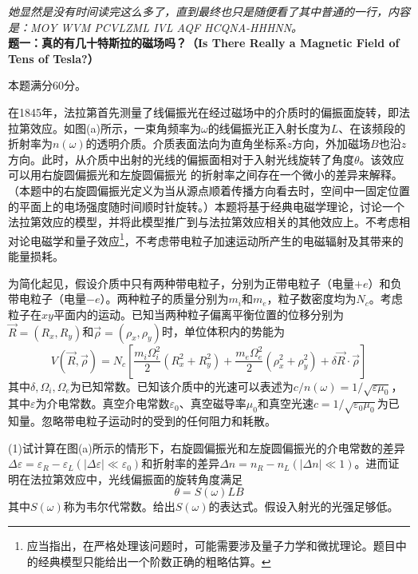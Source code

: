\documentclass[11pt,a4paper,onecolumn,UTF8]{ctexart}
\begin{document}
	\textit{她显然是没有时间读完这么多了，直到最终也只是随便看了其中普通的一行，内容是：MOY WVM PCVLZML IVL AQF HCQNA-HHHNN。}\\
	
	\noindent
	\textbf{题一：真的有几十特斯拉的磁场吗？（Is There Really a Magnetic Field of Tens of Tesla?）}
	
	本题满分60分。
	
	在1845年，法拉第首先测量了线偏振光在经过磁场中的介质时的偏振面旋转，即法拉第效应。如图(a)所示，一束角频率为$\omega$的线偏振光正入射长度为$L$、在该频段的折射率为$n(\omega)$的透明介质。介质表面法向为直角坐标系$z$方向，外加磁场$B$也沿$z$方向。此时，从介质中出射的光线的偏振面相对于入射光线旋转了角度$\theta$。该效应可以用右旋圆偏振光和左旋圆偏振光
	的折射率之间存在一个微小的差异来解释。（本题中的右旋圆偏振光定义为当从源点顺着传播方向看去时，空间中一固定位置的平面上的电场强度随时间顺时针旋转。）本题将基于经典电磁学理论，讨论一个法拉第效应的模型，并将此模型推广到与法拉第效应相关的其他效应上。不考虑相对论电磁学和量子效应\footnote{应当指出，在严格处理该问题时，可能需要涉及量子力学和微扰理论。题目中的经典模型只能给出一个阶数正确的粗略估算。}，不考虑带电粒子加速运动所产生的电磁辐射及其带来的能量损耗。
	
	为简化起见，假设介质中只有两种带电粒子，分别为正带电粒子（电量$+e$）和负带电粒子（电量$-e$）。两种粒子的质量分别为$m_i$和$m_e$，粒子数密度均为$N_c$。考虑粒子在$xy$平面内的运动。已知当两种粒子偏离平衡位置的位移分别为$\vec R=(R_x,R_y)$和$\vec\rho=(\rho_x,\rho_y)$时，单位体积内的势能为
	\begin{equation*}
		V(\vec R,\vec\rho)=N_c\left[\frac{m_i\Omega_i^2}{2}(R_x^2+R_y^2)+\frac{m_e\Omega_e^2}{2}(\rho_x^2+\rho_y^2)+\delta\vec{R}\cdot\vec{\rho}\right]
	\end{equation*}
	其中$\delta,\Omega_i,\Omega_e$为已知常数。已知该介质中的光速可以表述为$c/n(\omega)=1/\sqrt{\varepsilon\mu_0}$，其中$\varepsilon$为介电常数。真空介电常数$\varepsilon_0$、真空磁导率$\mu_0$和真空光速$c=1/\sqrt{\varepsilon_{0}\mu_0}$为已知量。忽略带电粒子运动时的受到的任何阻力和耗散。
	
	(1)试计算在图(a)所示的情形下，右旋圆偏振光和左旋圆偏振光的介电常数的差异$\Delta\varepsilon=\varepsilon_R-\varepsilon_L(|\Delta\varepsilon|\ll\varepsilon_{0})$和折射率的差异$\Delta n=n_R-n_L(|\Delta n|\ll1)$。进而证明在法拉第效应中，光线偏振面的旋转角度满足
	\begin{equation*}
		\theta=S(\omega)LB
	\end{equation*}
	其中$S(\omega)$称为韦尔代常数。给出$S(\omega)$的表达式。假设入射光的光强足够低。
	
\end{document}
